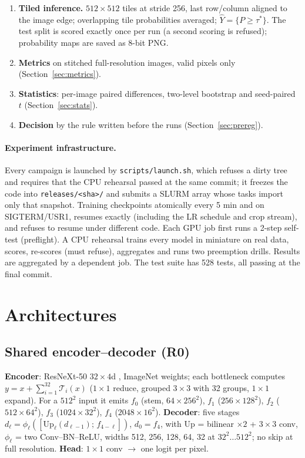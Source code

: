 \documentclass[11pt]{article}
\begin{document}
\begin{enumerate}
        $\tau^\ast\in\{0.20,0.25,\dots,0.80\}$ maximising pooled validation IoU is frozen.
  \item \textbf{Tiled inference.} $512\times512$ tiles at stride 256, last row/column aligned to the
        image edge; overlapping tile probabilities averaged; $\hat Y = \{P\ge\tau^\ast\}$. The test
        split is scored exactly once per run (a second scoring is refused); probability maps are
        saved as 8-bit PNG.
  \item \textbf{Metrics} on stitched full-resolution images, valid pixels only (Section~\ref{sec:metrics}).
  \item \textbf{Statistics}: per-image paired differences, two-level bootstrap and seed-paired $t$
        (Section~\ref{sec:stats}).
  \item \textbf{Decision} by the rule written before the runs (Section~\ref{sec:prereg}).
\end{enumerate}

\paragraph{Experiment infrastructure.} Every campaign is launched by \texttt{scripts/launch.sh},
which refuses a dirty tree and requires that the CPU rehearsal passed at the same commit; it freezes
the code into \texttt{releases/<sha>/} and submits a SLURM array whose tasks import only that
snapshot. Training checkpoints atomically every 5 min and on SIGTERM/USR1, resumes exactly
(including the LR schedule and crop stream), and refuses to resume under different code. Each GPU job
first runs a 2-step self-test (preflight). A CPU rehearsal trains every model in miniature on real
data, scores, re-scores (must refuse), aggregates and runs two preemption drills. Results are
aggregated by a dependent job. The test suite has 528 tests, all passing at the final commit.

\section{Architectures}
\label{sec:arch}

\subsection{Shared encoder--decoder (R0)}
\textbf{Encoder}: ResNeXt-50 $32\times4$d \cite{xie2017}, ImageNet weights; each bottleneck computes
$y = x + \sum_{i=1}^{32}\mathcal{T}_i(x)$ ($1\times1$ reduce, grouped $3\times3$ with 32 groups,
$1\times1$ expand). For a $512^2$ input it emits $f_0$ (stem, $64\times256^2$), $f_1$
($256\times128^2$), $f_2$ ($512\times64^2$), $f_3$ ($1024\times32^2$), $f_4$ ($2048\times16^2$).
\textbf{Decoder}: five stages $d_\ell = \phi_\ell([\mathrm{Up}_\ell(d_{\ell-1});\,f_{4-\ell}])$,
$d_0=f_4$, with $\mathrm{Up}$ = bilinear $\times2$ + $3\times3$ conv, $\phi_\ell$ = two
Conv--BN--ReLU, widths 512, 256, 128, 64, 32 at $32^2\ldots512^2$; no skip at full resolution.
\textbf{Head}: $1\times1$ conv $\to$ one logit per pixel.
\end{document}
